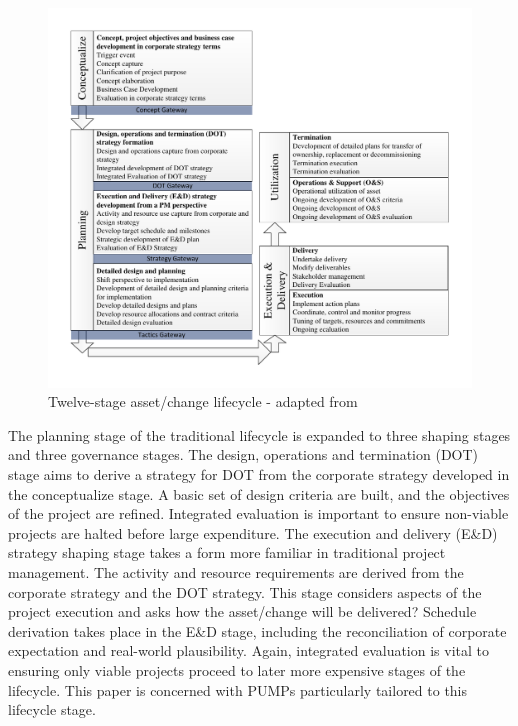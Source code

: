\begin{figure}[!h]
  \centering
    \includegraphics[width = \textwidth]{./Figures/ProjectLifecycleDetailedCurve.pdf} 
\caption{Twelve-stage asset/change lifecycle - adapted from \cite{chapman}}
\label{Figure:Project_Lifecycle}
\end{figure}

The planning stage of the traditional lifecycle is expanded to three shaping stages and three governance stages.
The design, operations and termination (DOT) stage aims to derive a strategy for DOT from the corporate strategy developed in the conceptualize stage.
A basic set of design criteria are built, and the objectives of the project are refined. 
Integrated evaluation is important to ensure non-viable projects are halted before large expenditure.
The execution and delivery (E\&D) strategy shaping stage takes a form more familiar in traditional project management.
The activity and resource requirements are derived from the corporate strategy and the DOT strategy.
This stage considers aspects of the project execution and asks how the asset/change will be delivered?
Schedule derivation takes place in the E\&D stage, including the reconciliation of corporate expectation and real-world plausibility.
Again, integrated evaluation is vital to ensuring only viable projects proceed to later more expensive stages of the lifecycle.
This paper is concerned with PUMPs particularly tailored to this lifecycle stage.



